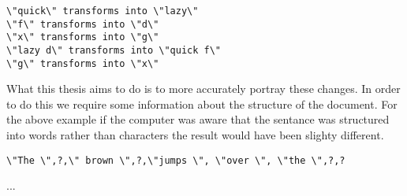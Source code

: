 \begin{verbatim}
\"quick\" transforms into \"lazy\"
\"f\" transforms into \"d\"
\"x\" transforms into \"g\"
\"lazy d\" transforms into \"quick f\"
\"g\" transforms into \"x\"
\end{verbatim}

What this thesis aims to do is to more accurately portray these changes.
In order to do this we require some information about the structure of the document.
For the above example if the computer was aware that the sentance was structured into words rather than characters the result would have been slighty different.

\begin{verbatim}
\"The \",?,\" brown \",?,\"jumps \", \"over \", \"the \",?,?
\end{verbatim}

...



  



